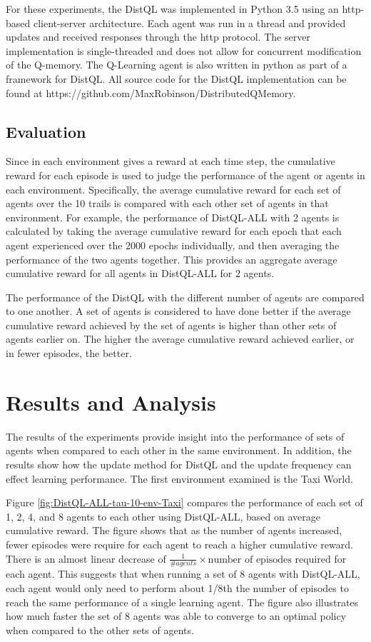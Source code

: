 \documentclass[jair,twoside,11pt,theapa]{article}
\begin{document}
For these experiments, the DistQL was implemented in Python 3.5 using an http-based client-server architecture. Each agent was run in a thread and provided updates and received responses through the http protocol. The server implementation is single-threaded and does not allow for concurrent modification of the Q-memory. The Q-Learning agent is also written in python as part of a framework for DistQL. All source code for the DistQL implementation can be found at https://github.com/MaxRobinson/DistributedQMemory.

\subsection{Evaluation} 
\label{evaluation}
Since in each environment gives a reward at each time step, the cumulative reward for each episode is used to judge the performance of the agent or agents in each environment. Specifically, the average cumulative reward for each set of agents over the 10 trails is compared with each other set of agents in that environment. For example, the performance of DistQL-ALL with 2 agents is calculated by taking the average cumulative reward for each epoch that each agent experienced over the 2000 epochs individually, and then averaging the performance of the two agents together. This provides an aggregate average cumulative reward for all agents in DistQL-ALL for 2 agents. 

The performance of the DistQL with the different number of agents are compared to one another. A set of agents is considered to have done better if the average cumulative reward achieved by the set of agents is higher than other sets of agents earlier on. The higher the average cumulative reward achieved earlier, or in fewer episodes, the better.

\section{Results and Analysis}
\label{results}
The results of the experiments provide insight into the performance of sets of agents when compared to each other in the same environment. In addition, the results show how the update method for DistQL and the update frequency can effect learning performance. The first environment examined is the Taxi World. 

Figure \ref{fig:DistQL-ALL-tau-10-env-Taxi} compares the performance of each set of 1, 2, 4, and 8 agents to each other using DistQL-ALL, based on average cumulative reward. The figure shows that as the number of agents increased, fewer episodes were require for each agent to reach a higher cumulative reward. There is an almost linear decrease of $\frac{1}{\# agents} \times \text{number of episodes required}$ for each agent. This suggests that when running a set of 8 agents with DistQL-ALL, each agent would only need to perform about 1/8th the number of episodes to reach the same performance of a single learning agent. The figure also illustrates how much faster the set of 8 agents was able to converge to an optimal policy when compared to the other sets of agents.
\end{document}
